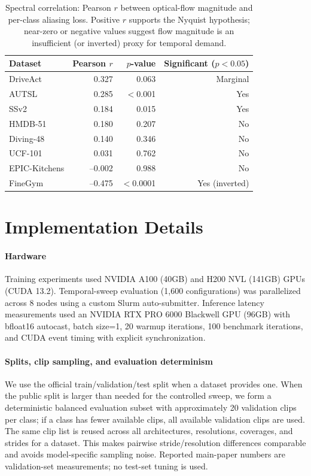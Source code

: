 \documentclass[a4paper, 10pt, conference, onecolumn]{ieeeconf}
\newcommand{\tabtight}{\setlength{\tabcolsep}{3.5pt}\renewcommand{\arraystretch}{1.12}}
\begin{document}
\begin{table}[!htbp]
\centering
\caption{Spectral correlation: Pearson $r$ between optical-flow magnitude and per-class aliasing loss. Positive $r$ supports the Nyquist hypothesis; near-zero or negative values suggest flow magnitude is an insufficient (or inverted) proxy for temporal demand.}
\label{tab:spectral}
\scriptsize\tabtight
\begin{tabular}{l r r r}
\toprule
Dataset & Pearson $r$ & $p$-value & Significant ($p{<}0.05$) \\
\midrule
DriveAct      & 0.327 & 0.063 & Marginal \\
AUTSL         & 0.285 & $<$0.001 & Yes \\
SSv2          & 0.184 & 0.015 & Yes \\
HMDB-51       & 0.180 & 0.207 & No \\
Diving-48     & 0.140 & 0.346 & No \\
UCF-101       & 0.031 & 0.762 & No \\
EPIC-Kitchens & --0.002 & 0.988 & No \\
FineGym       & --0.475 & $<$0.0001 & Yes (inverted) \\
\bottomrule
\end{tabular}
\end{table}

\section{Implementation Details}
\label{sec:sup_impl}

\paragraph{Hardware}
Training experiments used NVIDIA A100 (40GB) and H200 NVL (141GB) GPUs (CUDA 13.2). Temporal-sweep evaluation (1,600 configurations) was parallelized across 8 nodes using a custom Slurm auto-submitter. Inference latency measurements used an NVIDIA RTX PRO 6000 Blackwell GPU (96GB) with bfloat16 autocast, batch size=1, 20 warmup iterations, 100 benchmark iterations, and CUDA event timing with explicit synchronization.

\paragraph{Splits, clip sampling, and evaluation determinism}
We use the official train/validation/test split when a dataset provides one. When the public split is larger than needed for the controlled sweep, we form a deterministic balanced evaluation subset with approximately 20 validation clips per class; if a class has fewer available clips, all available validation clips are used. The same clip list is reused across all architectures, resolutions, coverages, and strides for a dataset. This makes pairwise stride/resolution differences comparable and avoids model-specific sampling noise. Reported main-paper numbers are validation-set measurements; no test-set tuning is used.
\end{document}
